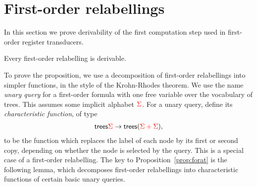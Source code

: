 \section{First-order  relabellings}\label{sec:fo-translation}
In this section we prove derivability of the first computation step used in first-order register transducers.
\begin{proposition} \label{prop:forat}    
    Every first-order relabelling is derivable.
\end{proposition}
To prove the proposition, we use a decomposition of first-order relabellings into simpler functions, in the style of the Krohn-Rhodes theorem. 
We use the name \emph{unary query} for a first-order formula with one free variable over the vocabulary of trees. This assumes some implicit alphabet ${\color{red}{\Sigma}}$.
For a  unary query,  define its  \emph{characteristic function},  of type
\begin{align*}
 \mathsf {trees} {\color{red}{\Sigma}} \to \mathsf {trees} ({\color{red}{{\color{red}{\Sigma}}+ {\color{red}{\Sigma}}}}),
\end{align*}
to be the function which replaces the label of each node by its first or second copy, depending on whether the node is selected by the query. This is a special case of a first-order relabelling. The key to Proposition~\ref{prop:forat} is the following  lemma, which decomposes first-order relabellings  into characteristic functions of certain basic unary queries.

